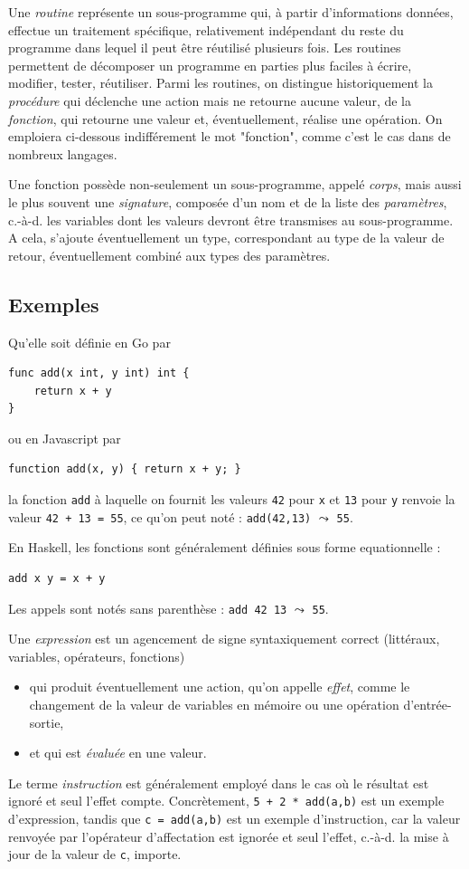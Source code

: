 \documentclass[a4paper,francais]{insalyon}
\newcommand{\cad}{c.-à-d.}
\begin{document}
Une \emph{routine} représente un sous-programme qui, à partir d'informations données, effectue un traitement spécifique, relativement indépendant du reste du programme dans lequel il peut être réutilisé plusieurs fois. Les routines permettent de décomposer un programme en parties plus faciles à écrire, modifier, tester, réutiliser. Parmi les routines, on distingue historiquement la \emph{procédure} qui déclenche une action mais ne retourne aucune valeur, de la \emph{fonction}, qui retourne une valeur et, éventuellement, réalise une opération. On emploiera ci-dessous indifférement le mot "fonction", comme c'est le cas dans de nombreux langages.    

Une fonction possède non-seulement un sous-programme, appelé \emph{corps}, mais aussi le plus souvent une \emph{signature}, composée d'un nom et de la liste des \emph{paramètres}, {\cad} les variables dont les valeurs devront être transmises au sous-programme. A cela, s'ajoute éventuellement un type, correspondant au type de la valeur de retour, éventuellement combiné aux types des paramètres.

\subsection{Exemples}

Qu'elle soit définie en Go par 
\begin{verbatim}
func add(x int, y int) int {
	return x + y
}
\end{verbatim}
ou en Javascript par  
\begin{verbatim}
function add(x, y) { return x + y; }
\end{verbatim}
la fonction \texttt{add} à laquelle on fournit les valeurs \texttt{42} pour \texttt{x} et \texttt{13} pour \texttt{y} renvoie la valeur \verb!42 + 13 = 55!, ce qu'on peut noté : \verb!add(42,13)! $\leadsto$ \texttt{55}.

En Haskell, les fonctions sont généralement définies sous forme equationnelle :  
\begin{verbatim}
add x y = x + y
\end{verbatim}

Les appels sont notés sans parenthèse : \verb!add 42 13! $\leadsto$ \texttt{55}. 

Une \emph{expression} est un agencement de signe syntaxiquement correct (littéraux, variables, opérateurs, fonctions)
\begin{itemize}
\item qui produit éventuellement une action, qu'on appelle \emph{effet}, comme le changement de la valeur de variables en mémoire ou une opération d'entrée-sortie, 
\item et qui est \emph{évaluée} en une valeur. 
\end{itemize}
Le terme \emph{instruction} est généralement employé dans le cas où le résultat est ignoré et seul l'effet compte. Concrètement, \verb!5 + 2 * add(a,b)! est un exemple d'expression, tandis que \verb!c = add(a,b)! est un exemple d'instruction, car la valeur renvoyée par l'opérateur d'affectation est ignorée et seul l'effet, {\cad} la mise à jour de la valeur de \texttt{c}, importe.   
\end{document}
